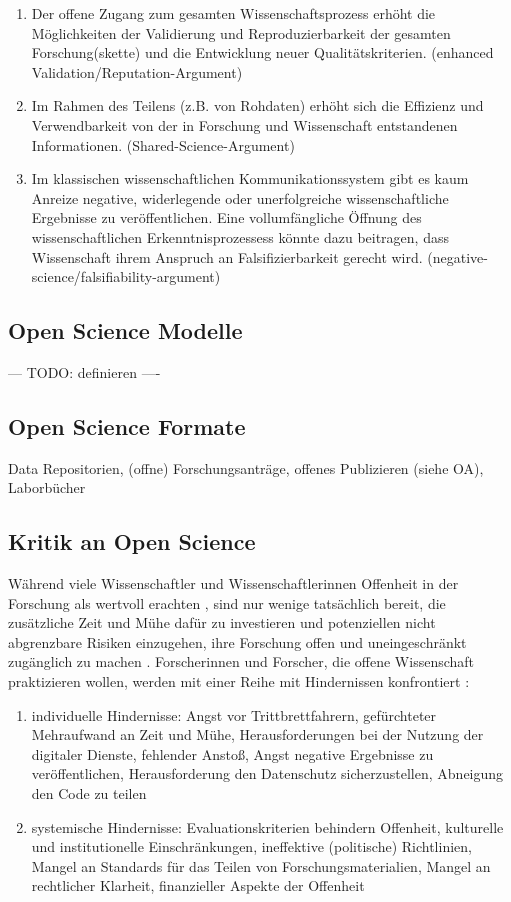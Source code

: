 \begin{enumerate}
\item Der offene Zugang zum gesamten Wissenschaftsprozess erhöht die Möglichkeiten der Validierung und Reproduzierbarkeit der gesamten Forschung(skette) und die Entwicklung neuer Qualitätskriterien. (enhanced Validation/Reputation-Argument)
\item Im Rahmen des Teilens (z.B. von Rohdaten) erhöht sich die Effizienz und Verwendbarkeit von der in Forschung und Wissenschaft entstandenen Informationen. (Shared-Science-Argument)
\item Im klassischen wissenschaftlichen Kommunikationssystem gibt es kaum Anreize negative, widerlegende oder unerfolgreiche wissenschaftliche Ergebnisse zu veröffentlichen. Eine vollumfängliche Öffnung des wissenschaftlichen Erkenntnisprozessess könnte dazu beitragen, dass Wissenschaft ihrem Anspruch an Falsifizierbarkeit gerecht wird. (negative-science/falsifiability-argument)
\end{enumerate}

\subsection{Open Science Modelle}
--- TODO: definieren ----
\subsection{Open Science Formate}
Data Repositorien, (offne) Forschungsanträge, offenes Publizieren (siehe OA), Laborbücher

\subsection{Kritik an Open Science}

Während viele Wissenschaftler und Wissenschaftlerinnen Offenheit in der Forschung als wertvoll erachten \cite{suchen}, sind nur wenige tatsächlich bereit, die zusätzliche Zeit und Mühe dafür zu investieren und potenziellen nicht abgrenzbare Risiken einzugehen, ihre Forschung offen und uneingeschränkt zugänglich zu machen \cite{Scheliga_2014} \cite{Procter_2010}. Forscherinnen und Forscher, die offene Wissenschaft praktizieren wollen, werden mit einer Reihe mit Hindernissen konfrontiert \cite{Scheliga_2014}: 
\begin{enumerate}
\item individuelle Hindernisse: Angst vor Trittbrettfahrern, gefürchteter Mehraufwand an Zeit und Mühe, Herausforderungen bei der Nutzung der digitaler Dienste, fehlender Anstoß, Angst negative Ergebnisse zu veröffentlichen, Herausforderung den Datenschutz sicherzustellen, Abneigung den Code zu teilen
\item systemische Hindernisse: Evaluationskriterien behindern Offenheit, kulturelle und institutionelle Einschränkungen, ineffektive (politische) Richtlinien, Mangel an Standards für das Teilen von Forschungsmaterialien, Mangel an rechtlicher Klarheit, finanzieller Aspekte der Offenheit
\end{enumerate}

